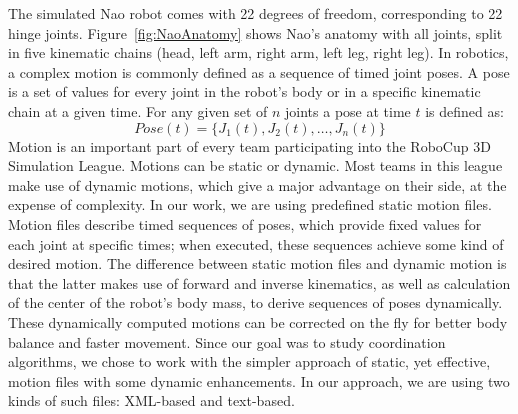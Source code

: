 The simulated Nao robot comes with 22 degrees of freedom, corresponding to 22 hinge joints. Figure~\ref{fig:NaoAnatomy} shows Nao's anatomy with all joints, split in five kinematic chains (head, left arm, right arm, left leg, right leg).
In robotics, a complex motion is commonly defined as a sequence of timed joint poses. A pose is a set of values for every joint in the robot's body or in a specific kinematic chain at a given time. 
For any given set of $n$ joints a pose at time $t$ is defined as:
\[
Pose(t)= \lbrace J_{1}(t), J_{2}(t), \ldots ,J_{n}(t) \rbrace
\]
Motion is an important part of every team participating into the RoboCup 3D Simulation League. Motions can be static or dynamic. Most teams in this league make use of dynamic motions, which give a major advantage on their side, at the expense of complexity. In our work, we are using predefined static motion files. Motion files describe timed sequences of poses, which provide fixed values for each joint at specific times; when executed, these sequences achieve some kind of desired motion. The difference between static motion files and dynamic motion is that the latter makes use of forward and inverse kinematics, as well as calculation of the center of the robot's body mass, to derive sequences of poses dynamically. These dynamically computed motions can be corrected on the fly for better body balance and faster movement. Since our goal was to study coordination algorithms, we chose to work with the simpler approach of static, yet effective, motion files with some dynamic enhancements. In our approach, we are using two kinds of such files: XML-based and text-based.


